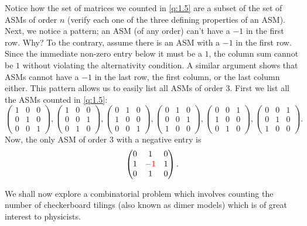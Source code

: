 \begin{solution}
Notice how the set of matrices we counted in \cref{q:1.5} are a subset of the set of ASMs of order $n$ (verify each one of the three defining properties of an ASM). Next, we notice a pattern; an ASM (of any order) can't have a $-1$ in the first row. Why? To the contrary, assume there is an ASM with a $-1$ in the first row. Since the immediate non-zero entry below it must be a $1$, the column sum cannot be $1$ without violating the alternativity condition. A similar argument shows that ASMs cannot have a 
$-1$ in the last row, the first column, or the last column either. This pattern allows us to easily list all ASMs of order $3$.
First we list all the ASMs counted in \cref{q:1.5}:
\[
\begin{pmatrix}
    1 & 0 & 0 \\
    0 & 1 & 0 \\
    0 & 0 & 1
\end{pmatrix},
\begin{pmatrix}
    1 & 0 & 0 \\
    0 & 0 & 1 \\
    0 & 1 & 0
\end{pmatrix},
\begin{pmatrix}
    0 & 1 & 0 \\
    1 & 0 & 0 \\
    0 & 0 & 1
\end{pmatrix},
\begin{pmatrix}
    0 & 1 & 0 \\
    0 & 0 & 1 \\
    1 & 0 & 0
\end{pmatrix},
\begin{pmatrix}
    0 & 0 & 1 \\
    1 & 0 & 0 \\
    0 & 1 & 0
\end{pmatrix},
\begin{pmatrix}
    0 & 0 & 1 \\
    0 & 1 & 0 \\
    1 & 0 & 0
\end{pmatrix}.
\]
Now, the only ASM of order $3$ with a negative entry is
\[
\begin{pmatrix}
    0 & 1 & 0 \\
    1 & \textcolor{red}{-1} & 1 \\
    0 & 1 & 0
\end{pmatrix}.
\]
\end{solution}
We shall now explore a combinatorial problem which involves counting the number of checkerboard tilings (also known as dimer models) which is of great interest to physicists. 

